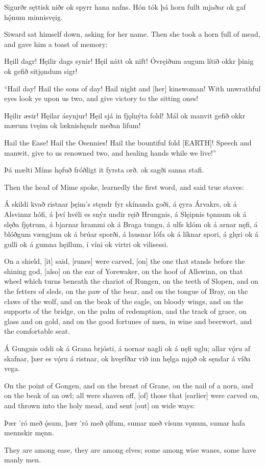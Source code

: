 Sigurðr sęttisk niðr ok spyrr hana nafns. Hón tók þá horn fullt mjaðar ok gaf hǫ́num minnisvęig. 

Siward sat himself down, asking for her name. Then she took a horn full of mead, and gave him a toast of memory:

Hęill dagr! \hld Hęilir dags synir!
\ind Hęil nátt ok nift!
Óvręiðum augum \hld lítið okkr þinig
\ind ok gefið sitjǫndum sigr! 

“Hail day! Hail the sons of day! Hail night and [her] kinswoman! With unwrathful eyes look ye upon us two, and give victory to the sitting ones!

Hęilir æsir! \hld Hęilar ásynjur!
\ind Hęil sjá in fjǫlnýta fold!
Mál ok manvit \hld gefið okkr mærum tvęim
\ind ok læknishęndr meðan lifum! 

Hail the Ease! Hail the Osennies! Hail the bountiful fold [EARTH]! Speech and manwit, give to us renowned two, and healing hands while we live!”

Þá mælti \hld Míms hǫfuð
\ind fróðligt it fyrsta orð.
\ind ok sagði sanna stafi. 

Then the head of Mime spoke, learnedly the first word, and said true staves:

Á skildi kvað ristnar \hld þęim’s stęndr fyr skínanda goði,
á ęyra Árvakrs, \hld ok á Alsvinnz hófi,
á því hvéli es snýz \hld undir ręið Hrungnis,
á Slęipnis tǫnnum \hld ok á slęða fjǫtrum,
á bjarnar hrammi \hld ok á Braga tungu,
á ulfs klóm \hld ok á arnar nęfi,
á blóðgum vængjum \hld ok á brúar sporði,
á lausnar lófa \hld ok á líknar spori,
á glęri ok á gulli \hld ok á gumna hęillum,
í víni ok virtri \hld ok vilisessi. 

On a shield, [it] said, [runes] were carved, [on] the one that stands before the shining god, [also] on the ear of Yorewaker, on the hoof of Allswinn, on that wheel which turns beneath the chariot of Rungen, on the teeth of Slopen, and on the fetters of sleds, on the paw of the bear, and on the tongue of Bray, on the claws of the wolf, and on the beak of the eagle, on bloody wings, and on the supports of the bridge, on the palm of redemption, and the track of grace, on glass and on gold, and on the good fortunes of men, in wine and beerwort, and the comfortable seat.

Á Gungnis oddi \hld ok á Grana brjósti,
á nornar nagli \hld ok á nęfi uglu;
allar vǫ́ru af skafnar, \hld þær es vǫ́ru á ristnar,
\ind ok hvęrfðar við inn hęlga mjǫð
\ind ok sęndar á víða vega. 

On the point of Gongen, and on the breast of Grane, on the nail of a norn, and on the beak of an owl; all were shaven off, [of] those that [earlier] were carved on, and thrown into the holy mead, and sent [out] on wide ways:

Þær ’ró með ǫ́sum, \hld þær ’ró með ǫlfum,
sumar með vísum vǫnum, \hld sumar hafa mennskir męnn. 

They are among ease, they are among elves; some among wise wanes, some have manly men.
